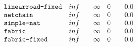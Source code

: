 \[\begin{array}{l l l l l l l l}
    \texttt{linearroad-fixed} & inf &  & \infty & 0  &  & 0.0 \\

    \texttt{netchain} & inf &  & \infty & 0  &  & 0.0 \\

    \texttt{simple-nat} & inf &  & \infty & 0  &  & 0.0 \\

    \texttt{fabric} & inf &  & \infty & 0  &  & 0.0 \\

    \texttt{fabric-fixed} & inf &  & \infty & 0  &  & 0.0 \\
\end{array}\]
